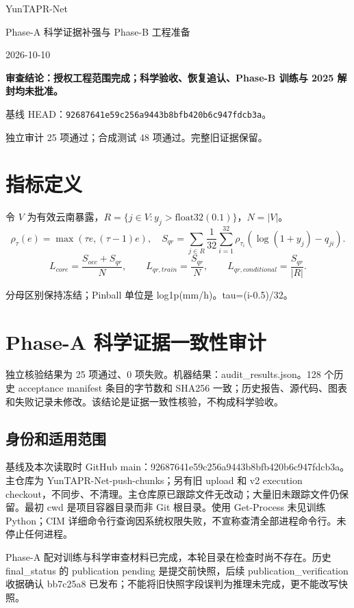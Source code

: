 \documentclass[UTF8,a4paper,10pt,fontset=fandol]{ctexart}
\begin{document}
\begin{center}{\LARGE YunTAPR-Net}\par{\Large Phase-A 科学证据补强与 Phase-B 工程准备}\par 2026-10-10\end{center}
\textbf{审查结论：授权工程范围完成；科学验收、恢复追认、Phase-B 训练与 2025 解封均未批准。}
\par 基线 HEAD：\texttt{92687641e59c256a9443b8bfb420b6c947fdcb3a}。
\par 独立审计 25 项通过；合成测试 48 项通过。完整旧证据保留。
\section*{指标定义}
令 $V$ 为有效云南暴露，$R=\{j\in V:y_j>\mathrm{float32}(0.1)\}$，$N=|V|$。
\[
\rho_\tau(e)=\max(\tau e,(\tau-1)e),\quad
S_{qr}=\sum_{j\in R}\frac1{32}\sum_{i=1}^{32}\rho_{\tau_i}(\log(1+y_j)-q_{ji}).
\]
\[
L_{core}=\frac{S_{occ}+S_{qr}}N,\qquad
L_{qr,train}=\frac{S_{qr}}N,\qquad
L_{qr,conditional}=\frac{S_{qr}}{|R|}.
\]
\par 分母区别保持冻结；Pinball 单位是 log1p(mm/h)。tau=(i-0.5)/32。
\clearpage
\section*{Phase-A 科学证据一致性审计}

独立核验结果为 25 项通过、0 项失败。机器结果：audit\_\allowbreak{}results.json。128 个历史 acceptance manifest 条目的字节数和 SHA256 一致；历史报告、源代码、图表和失败记录未修改。该结论是证据一致性核验，不构成科学验收。\par

\subsection*{身份和适用范围}

基线及本次读取时 GitHub main：92687641\allowbreak{}e59c256a\allowbreak{}9443b8bf\allowbreak{}b420b6c9\allowbreak{}47fdcb3a。主仓库为 YunTAPR-Net-push-chunks；另有旧 upload 和 v2 execution checkout，不同步、不清理。主仓库原已跟踪文件无改动；大量旧未跟踪文件仍保留。最初 cwd 是项目容器目录而非 Git 根目录。使用 Get-Process 未见训练 Python；CIM 详细命令行查询因系统权限失败，不宣称查清全部进程命令行。未停止任何进程。\par

Phase-A 配对训练与科学审查材料已完成，本轮目录在检查时尚不存在。历史 final\_\allowbreak{}status 的 publication pending 是提交前快照，后续 publication\_\allowbreak{}verification 收据确认 bb7c25a8 已发布；不能将旧快照字段误判为推理未完成，更不能改写快照。\par
\end{document}
